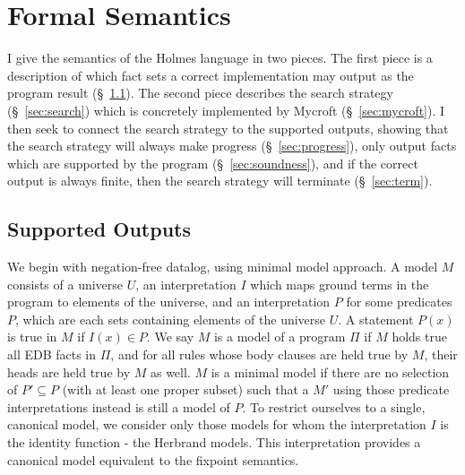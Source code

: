 \section{Formal Semantics}
\label{sec:formal}
I give the semantics of the Holmes language in two pieces.
The first piece is a description of which fact sets a correct implementation may output as the program result (\S~\ref{sec:allowed}).
The second piece describes the search strategy (\S~\ref{sec:search}) which is concretely implemented by Mycroft (\S~\ref{sec:mycroft}).
I then seek to connect the search strategy to the supported outputs, showing that the search strategy will always make progress (\S~\ref{sec:progress}), only output facts which are supported by the program (\S~\ref{sec:soundness}), and if the correct output is always finite, then the search strategy will terminate (\S~\ref{sec:term}).
\subsection{Supported Outputs}
\label{sec:allowed}
We begin with negation-free datalog, using minimal model approach.
A model $M$ consists of a universe $U$, an interpretation $I$ which maps ground terms in the program to elements of the universe, and an interpretation $P$ for some predicates $P$, which are each sets containing elements of the universe $U$.
A statement $P(x)$ is true in $M$ if $I(x) \in P$.
We say $M$ is a model of a program $\Pi$ if $M$ holds true all EDB facts in $\Pi$, and for all rules whose body clauses are held true by $M$, their heads are held true by $M$ as well.
$M$ is a minimal model if there are no selection of $P' \subseteq P$ (with at least one proper subset) such that a $M'$ using those predicate interpretations instead is still a model of $P$.
To restrict ourselves to a single, canonical model, we consider only those models for whom the interpretation $I$ is the identity function - the Herbrand models.
This interpretation provides a canonical model equivalent to the fixpoint semantics.

